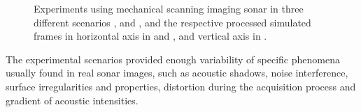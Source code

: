 \documentclass[final,5p,times]{elsarticle}
\begin{document}
\begin{figure}[!ht]
{        \label{fig:msis_sim2}
    }
    \captionsetup{justification=justified}
    \caption{Experiments using mechanical scanning imaging sonar in three
    different scenarios , 
    and , and the respective processed simulated
    frames in horizontal axis in  and
    , and vertical axis in .}
    \label{fig:msis}
\end{figure}

The experimental scenarios provided enough variability of specific phenomena
usually found in real sonar images, such as acoustic shadows, noise
interference, surface irregularities and properties, distortion during
the acquisition process and gradient of acoustic intensities.
\end{document}
